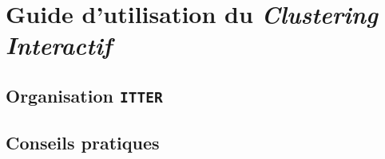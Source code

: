 \chapter{Guide d'utilisation du \textit{Clustering Interactif}}
\label{chapter:5-GUIDE}

	\section{Organisation \texttt{ITTER}}
		\label{section:5.1-GUIDE-ITTER}
	
	
	\section{Conseils pratiques}
		\label{section:5.2-GUIDE-CONSEILS}
		
		
